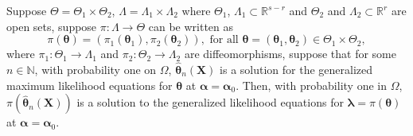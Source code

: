 \documentclass[lineno]{biometrika}
\newcommand{\bs}{\boldsymbol}
\begin{document}
\begin{proposition} Suppose $\Theta=\Theta_1\times \Theta_2$, $\Lambda=\Lambda_1\times \Lambda_2$ where  $\Theta_1$, $\Lambda_1\subset \mathbb{R}^{s-r}$ and $\Theta_2$ and $\Lambda_2\subset \mathbb{R}^r$ are open sets, suppose $\pi:\Lambda\to \Theta$ can be written as
 \begin{equation*}\pi(\bs{\theta})=(\pi_1(\bs{\theta}_1),\pi_2(\bs{\theta}_2)),\mbox{ for all }\bs{\theta}=(\bs{\theta}_1,\bs{\theta}_2)\in \Theta_1\times \Theta_2,
 \end{equation*}
where $\pi_1:\Theta_1\to \Lambda_1$ and $\pi_2:\Theta_2\to \Lambda_2$ are diffeomorphisms, suppose that for some $n\in \mathbb{N}$, with probability one on $\Omega$, $\bs{\hat{\theta}}_n(\bs{X})$ is a solution for the generalized maximum likelihood equations for $\bs{\theta}$ at $\bs{\alpha}=\bs{\alpha}_0$. Then, with probability one in $\Omega$, $\pi (\bs{\hat{\theta}}_n(\bs{X}))$ is a solution to the generalized likelihood equations for $\bs{\lambda}=\pi(\bs{\theta})$ at $\bs{\alpha}=\bs{\alpha}_0$.
\end{proposition}
\end{document}
